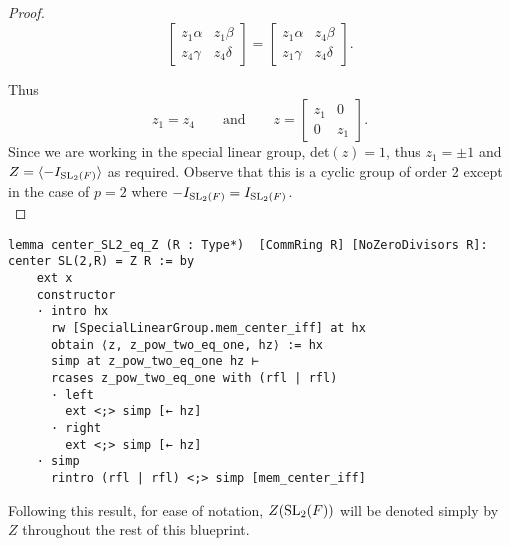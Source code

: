 \begin{proof}
\begin{equation*} \begin{bmatrix} z_1 \alpha & z_1 \beta \\ z_4 \gamma & z_4 \delta \end{bmatrix} = \begin{bmatrix} z_1 \alpha & z_4 \beta \\ z_1 \gamma & z_4 \delta \end{bmatrix}. \end{equation*}

Thus 
\begin{equation*} 
    z_1 = z_4 \qquad  \text{and} \qquad z =  
    \begin{bmatrix} z_1 & 0 \\ 0 & z_1 \end{bmatrix}. 
\end{equation*}
Since we are working in the special linear group, det$(z)=1$, thus $z_1 = \pm 1$ and $Z = \langle - I_{\operatorname{SL}_2(F)}\rangle$ as required. Observe that this is a cyclic group of order 2 except in the case of $p = 2$ where $- I_{\operatorname{SL}_2(F)} = I_{\operatorname{SL}_2(F)}$. \\
\end{proof}
\begin{footnotesize}
\begin{verbatim}
lemma center_SL2_eq_Z (R : Type*)  [CommRing R] [NoZeroDivisors R]: center SL(2,R) = Z R := by
    ext x
    constructor
    · intro hx
      rw [SpecialLinearGroup.mem_center_iff] at hx
      obtain ⟨z, z_pow_two_eq_one, hz⟩ := hx
      simp at z_pow_two_eq_one hz ⊢
      rcases z_pow_two_eq_one with (rfl | rfl)
      · left
        ext <;> simp [← hz]
      · right
        ext <;> simp [← hz]
    · simp
      rintro (rfl | rfl) <;> simp [mem_center_iff]
\end{verbatim}
\end{footnotesize}

Following this result, for ease of notation, $Z(\operatorname{SL}_2(F))$ will be denoted simply by $Z$ throughout the rest of this blueprint.

